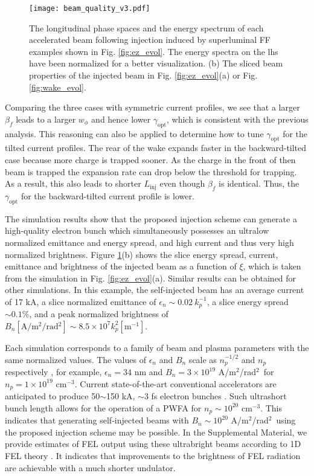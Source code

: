 \documentclass[
aps,
prl,
reprint,
superscriptaddress,
amsmath,
amssymb,
showpacs
]{revtex4-2}
\newcommand{\Bunit}{A/m$^2$/rad$^2$}
\begin{document}
\begin{figure}[htbp]
\texttt{[image: beam\_quality\_v3.pdf]}
\caption{\label{fig:beam_quality}
  The longitudinal phase spaces and the energy spectrum of each accelerated beam following injection induced by superluminal FF examples shown in Fig. \ref{fig:ez_evol}. The energy spectra on the lhs have been normalized for a better visualization. (b) The sliced beam properties of the injected beam in Fig. \ref{fig:ez_evol}(a) or Fig. \ref{fig:wake_evol}.
}
\end{figure}

Comparing the three cases with symmetric current profiles, we see that a larger $\beta_f$ leads to a larger $w_\phi$ and hence lower $\gamma_\text{opt}$, which is consistent with the previous analysis. This reasoning can also be applied to determine how to tune $\gamma_\text{opt}$ for the tilted current profiles. The rear of the wake expands faster in the backward-tilted case because more charge is trapped sooner. As the charge in the front of then beam is trapped the expansion rate can drop below the threshold for trapping. As a result, this also leads to shorter $L_\text{inj}$ even though $\beta_f$ is identical. Thus, the $\gamma_\text{opt}$ for the backward-tilted current profile is lower.

The simulation results show that the proposed injection scheme can generate a high-quality electron bunch which simultaneously possesses an ultralow normalized emittance and energy spread, and high current and thus very high normalized brightness.
Figure \ref{fig:beam_quality}(b) shows the slice energy spread, current, emittance and brightness of the injected beam as a function of $\xi$, which is taken from the simulation in Fig. \ref{fig:ez_evol}(a). Similar results can be obtained for other simulations. In this example, the self-injected beam has an average current of 17 kA, a slice normalized emittance of $\epsilon_n\sim0.02~k_p^{-1}$, a slice energy spread $\sim0.1\%$, and a peak normalized brightness of $B_n[\text{\Bunit}]\sim8.5\times10^7 k_p^2[\text{m$^{-1}$}]$.

Each simulation corresponds to a family of beam and plasma parameters with the same normalized values. The values of $\epsilon_n$ and $B_n$ scale as $n_p^{-1/2}$ and $n_p$ respectively \cite{Xu2017}, for example, $\epsilon_n=34$ nm and $B_n=3\times10^{19}$ \Bunit~for $n_p=1\times10^{19}$ cm$^{-3}$. Current state-of-the-art conventional accelerators are anticipated to produce 50$\sim$150 kA, $\sim$3 fs electron bunches \cite{Yakimenko2019}.
Such ultrashort bunch length allows for the operation of a PWFA for $n_p\sim10^{20}$ cm$^{-3}$.
This indicates that generating self-injected beams with $B_n\sim10^{20}$ \Bunit~using the proposed injection scheme may be possible. In the Supplemental Material, we provide estimates of FEL output using these ultrabright beams according to 1D FEL theory \cite{Freund1992}. It indicates that improvements to the brightness of FEL radiation are achievable with a much shorter undulator. 
\end{document}
